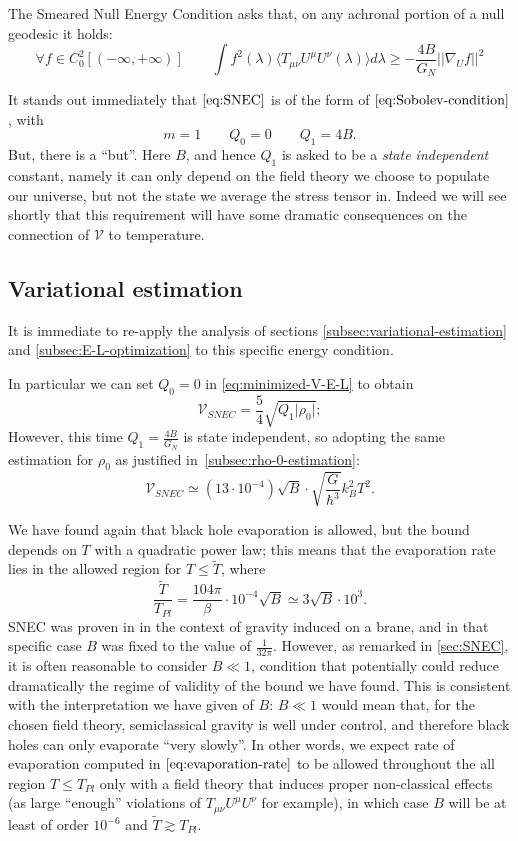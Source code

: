 \begin{definition}
	The Smeared Null Energy Condition asks that, on any achronal portion of a null geodesic it holds:
	\begin{equation}
		\label{eq:SNEC}
		\forall f \in C_0^2[(-\infty, +\infty)] \quad\quad \int f^2(\lambda)\langle T_{\mu\nu}U^{\mu}U^{\nu}(\lambda) \rangle d\lambda \ge -\frac{4B}{G_N}\vert\vert \nabla_U f\vert\vert^2
	\end{equation}
\end{definition}

It stands out immediately that \(\eqref{eq:SNEC}\) is of the form of \(\eqref{eq:Sobolev-condition}\), with 
\[
m = 1 \quad \quad Q_0 = 0 \quad \quad Q_1 = 4B.	
\]
But, there is a ``but''. Here \(B\), and hence \(Q_1\) is asked to be a \emph{state independent} constant, namely it can only depend on the field theory we choose to populate our universe, but not the state we average the stress tensor in. 
Indeed we will see shortly that this requirement will have some dramatic consequences on the connection of \(\mathcal{V}\) to temperature.

\subsection{Variational estimation}
It is immediate to re-apply the analysis of sections \ref{subsec:variational-estimation} and \ref{subsec:E-L-optimization} to this specific energy condition.

In particular we can set \(Q_0 = 0\) in \eqref{eq:minimized-V-E-L} to obtain
\[
	\mathcal{V}_{SNEC} = \frac{5}{4}\sqrt{Q_1\vert\rho_0\vert};
\]
However, this time \(Q_1 = \frac{4B}{G_N}\) is state independent, so adopting the same estimation for \(\rho_0\) as justified in~\ref{subsec:rho-0-estimation}:
\[
\mathcal{V}_{SNEC} \simeq (13\cdot 10^{- 4})\sqrt{B} \cdot \sqrt{\frac{G}{\hbar^3}}k_B^2T^2.	
\] 

We have found again that black hole evaporation is allowed, but the bound depends on \(T\) with a quadratic power law; this means that the evaporation rate lies in the allowed region for \(T \le \tilde{T}\), where
\[
\frac{\tilde{T}}{T_{Pl}} = \frac{104\pi}{\beta}\cdot 10^{-4}\sqrt{B} \simeq 3\sqrt{B} \cdot 10^3.
\]
SNEC was proven in \cite{leichenauer2019upper} in the context of gravity induced on a brane, and in that specific case \(B\) was fixed to the value of \(\frac{1}{32\pi}\). However, as remarked in \ref{sec:SNEC}, it is often reasonable to consider \(B\ll 1\), condition that potentially could reduce dramatically the regime of validity of the bound we have found. This is consistent with the interpretation we have given of \(B\): \(B \ll 1\) would mean that, for the chosen field theory, semiclassical gravity is well under control, and therefore black holes can only evaporate ``very slowly''. 
\noindent
In other words, we expect rate of evaporation computed in \(\eqref{eq:evaporation-rate}\) to be allowed throughout the all region \(T\le T_{Pl}\) only with a field theory that induces proper non-classical effects (as large ``enough'' violations of \(T_{\mu\nu}U^{\mu}U^{\nu}\) for example), in which case \(B\) will be at least of order \(10^{-6}\) and \(\tilde{T} \gtrsim T_{Pl}\).

